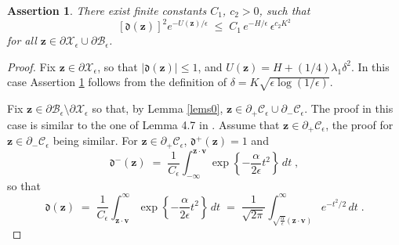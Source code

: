 \documentclass[reqno]{amsart}
\newcounter{as}[section]
\newtheorem{asser}[as]{Assertion}
\newcommand{\mc}[1]{{\mathcal #1}}
\newcommand{\mf}[1]{{\mathfrak #1}}
\newcommand{\bs}[1]{{\boldsymbol #1}}
\newcommand{\<}{\langle}
\renewcommand{\>}{\rangle}
\begin{document}
\begin{asser}
\label{bl5}
There exist finite constants $C_{1}$, $c_{2}>0$,
such that
\begin{equation*}
\left[\mf{d}(\bs{z})\right]^{2}e^{-U(\bs{z})/\epsilon}
\;\le\;C_{1} \, e^{-H/\epsilon} \, \epsilon^{c_{2}K^{2}}
\end{equation*}
for all $\bs{z}\in\partial\mc{X}_{\epsilon}\cup\partial\mc{B}_{\epsilon}$.
\end{asser}

\begin{proof}
Fix $\bs{z}\in\partial\mc{X}_{\epsilon}$, so that $|\mf{d}(\bs{z})|
\le 1$, and $U(\bs{z})=H + (1/4) \lambda_{1} \delta^{2}$. In this case
Assertion \ref{bl5} follows from the definition of $\delta = K
\sqrt{\epsilon\log(1/\epsilon)}$.

Fix $\bs{z} \in \partial \mc{B}_{\epsilon} \setminus \partial
\mc{X}_{\epsilon}$ so that, by Lemma \ref{lems0}, $\bs{z}
\in \partial_{+} \mc{C}_{\epsilon} \cup \partial_{-}
\mc{C}_{\epsilon}$.  The proof in this case is similar to the one of
Lemma 4.7 in \cite{LS1}. Assume that
$\bs{z}\in \partial_{+}\mc{C}_{\epsilon}$, the proof for
$\bs{z}\in \partial_{-}\mc{C}_{\epsilon}$ being similar.  For $\bs{z}
\in \partial_{+}\mc{C}_{\epsilon}$, $\mf{d}^{+}(\bs{z})=1$ and
\begin{equation*}
\mf{d}^{-}(\bs{z})\;=\;\frac{1}{C_{\epsilon}}
\int_{-\infty}^{\bs{z}\cdot\bs{v}} \exp \left\{
-\frac{\alpha}{2\epsilon}t^{2}\right\} \, dt\;,
\end{equation*}
so that
\begin{equation}
\label{se21}
\mf{d}(\bs{z})\;=\; \frac{1}{C_{\epsilon}}
\int_{\bs{z}\cdot\bs{v}}^{\infty}\exp\left\{
-\frac{\alpha}{2\epsilon}t^{2}\right\} \, dt
\;=\;\frac{1}{\sqrt{2\pi}}
\int_{\sqrt{\frac{\alpha}{\epsilon}}(\bs{z}\cdot\bs{v})}^{\infty}
e^{- t^{2}/2 } \, dt\;.
\end{equation}


\end{proof}
\end{document}

